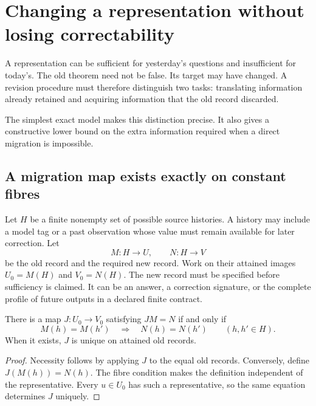 \chapter{Changing a representation without losing correctability}\label{ch:migration}

A representation can be sufficient for yesterday's questions and insufficient for today's. The old theorem need not be false. Its target may have changed. A revision procedure must therefore distinguish two tasks: translating information already retained and acquiring information that the old record discarded.

The simplest exact model makes this distinction precise. It also gives a constructive lower bound on the extra information required when a direct migration is impossible.

\section{A migration map exists exactly on constant fibres}
Let $H$ be a finite nonempty set of possible source histories. A history may include a model tag or a past observation whose value must remain available for later correction. Let
\[
 M:H\to U,\qquad N:H\to V
\]
be the old record and the required new record. Work on their attained images $U_0=M(H)$ and $V_0=N(H)$. The new record must be specified before sufficiency is claimed. It can be an answer, a correction signature, or the complete profile of future outputs in a declared finite contract.

\begin{theorem}\label{r:migration}
There is a map $J:U_0\to V_0$ satisfying $JM=N$ if and only if
\[
 M(h)=M(h')\quad\Longrightarrow\quad N(h)=N(h')
 \qquad(h,h'\in H).
\]
When it exists, $J$ is unique on attained old records.
\end{theorem}
\begin{proof}
Necessity follows by applying $J$ to the equal old records. Conversely, define $J(M(h))=N(h)$. The fibre condition makes the definition independent of the representative. Every $u\in U_0$ has such a representative, so the same equation determines $J$ uniquely.
\end{proof}


